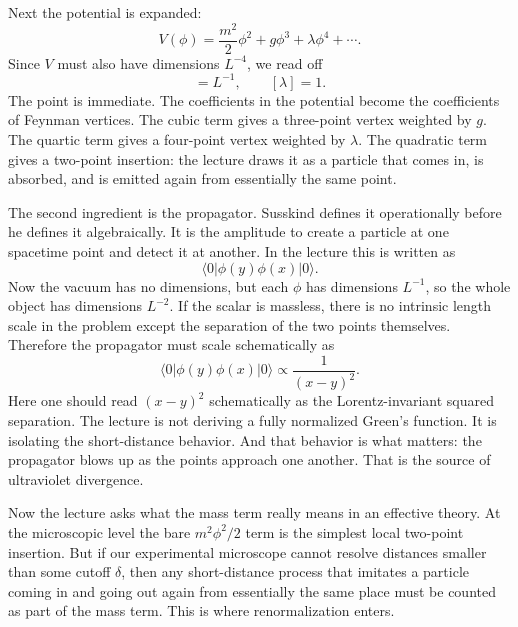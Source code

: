 Next the potential is expanded:
\begin{equation}
V(\phi)=\frac{m^2}{2}\phi^2+g\phi^3+\lambda\phi^4+\cdots.
\end{equation}
Since \(V\) must also have dimensions \(L^{-4}\), we read off
\begin{equation}
[g]=L^{-1},
\qquad
[\lambda]=1.
\end{equation}
The point is immediate. The coefficients in the potential become the coefficients of Feynman vertices. The cubic term gives a three-point vertex weighted by \(g\). The quartic term gives a four-point vertex weighted by \(\lambda\). The quadratic term gives a two-point insertion: the lecture draws it as a particle that comes in, is absorbed, and is emitted again from essentially the same point.

The second ingredient is the propagator. Susskind defines it operationally before he defines it algebraically. It is the amplitude to create a particle at one spacetime point and detect it at another. In the lecture this is written as
\begin{equation}
\langle 0|\phi(y)\phi(x)|0\rangle.
\end{equation}
Now the vacuum has no dimensions, but each \(\phi\) has dimensions \(L^{-1}\), so the whole object has dimensions \(L^{-2}\). If the scalar is massless, there is no intrinsic length scale in the problem except the separation of the two points themselves. Therefore the propagator must scale schematically as
\begin{equation}
\langle 0|\phi(y)\phi(x)|0\rangle \propto \frac{1}{(x-y)^2}.
\end{equation}
Here one should read \((x-y)^2\) schematically as the Lorentz-invariant squared separation. The lecture is not deriving a fully normalized Green's function. It is isolating the short-distance behavior. And that behavior is what matters: the propagator blows up as the points approach one another. That is the source of ultraviolet divergence.

Now the lecture asks what the mass term really means in an effective theory. At the microscopic level the bare \(m^2\phi^2/2\) term is the simplest local two-point insertion. But if our experimental microscope cannot resolve distances smaller than some cutoff \(\delta\), then any short-distance process that imitates a particle coming in and going out again from essentially the same place must be counted as part of the mass term. This is where renormalization enters.

